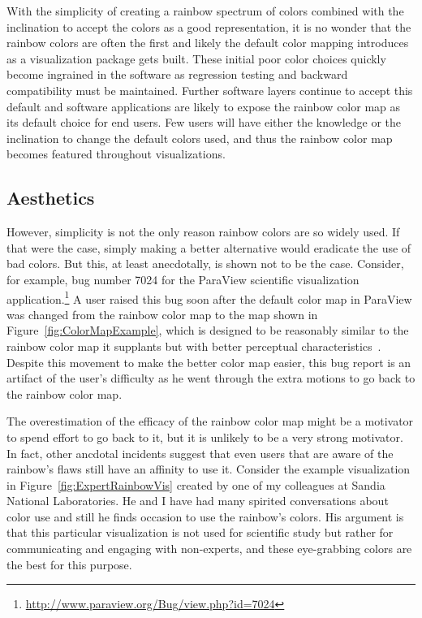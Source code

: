 \documentclass[letterpaper,twocolumn,fleqn]{article}
\newcommand*{\lcite}[1]{~\cite{#1}}
\begin{document}
With the simplicity of creating a rainbow spectrum of colors combined with
the inclination to accept the colors as a good representation, it is no
wonder that the rainbow colors are often the first and likely the default
color mapping introduces as a visualization package gets built. These
initial poor color choices quickly become ingrained in the software as
regression testing and backward compatibility must be maintained. Further
software layers continue to accept this default and software applications
are likely to expose the rainbow color map as its default choice for end
users. Few users will have either the knowledge or the inclination to
change the default colors used, and thus the rainbow color map becomes
featured throughout visualizations.

\subsection{Aesthetics}

\noindent
However, simplicity is not the only reason rainbow colors are so widely
used. If that were the case, simply making a better alternative would
eradicate the use of bad colors. But this, at least anecdotally, is shown
not to be the case. Consider, for example, bug number 7024 for the ParaView
scientific visualization
application.\footnote{\url{http://www.paraview.org/Bug/view.php?id=7024}} A
user raised this bug soon after the default color map in ParaView was
changed from the rainbow color map to the map shown in
Figure~\ref{fig:ColorMapExample}, which is designed to be reasonably
similar to the rainbow color map it supplants but with better perceptual
characteristics\lcite{Moreland2009}. Despite this movement to make the
better color map easier, this bug report is an artifact of the user's
difficulty as he went through the extra motions to go back to the rainbow
color map.

The overestimation of the efficacy of the rainbow color map might be a
motivator to spend effort to go back to it, but it is unlikely to be a very
strong motivator. In fact, other ancdotal incidents suggest that even users
that are aware of the rainbow's flaws still have an affinity to use it.
Consider the example visualization in Figure~\ref{fig:ExpertRainbowVis}
created by one of my colleagues at Sandia National Laboratories. He and I
have had many spirited conversations about color use and still he finds
occasion to use the rainbow's colors. His argument is that this particular
visualization is not used for scientific study but rather for communicating
and engaging with non-experts, and these eye-grabbing colors are the best
for this purpose.
\end{document}
